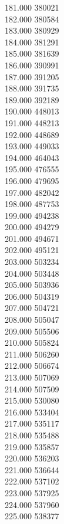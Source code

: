 { 181.000	380021 \\
 182.000	380584 \\
 183.000	380929 \\
 184.000	381291 \\
 185.000	381639 \\
 186.000	390991 \\
 187.000	391205 \\
 188.000	391735 \\
 189.000	392189 \\
 190.000	448013 \\
 191.000	448213 \\
 192.000	448689 \\
 193.000	449033 \\
 194.000	464043 \\
 195.000	476555 \\
 196.000	479695 \\
 197.000	482042 \\
 198.000	487753 \\
 199.000	494238 \\
 200.000	494279 \\
 201.000	494671 \\
 202.000	495121 \\
 203.000	503234 \\
 204.000	503448 \\
 205.000	503936 \\
 206.000	504319 \\
 207.000	504721 \\
 208.000	505047 \\
 209.000	505506 \\
 210.000	505824 \\
 211.000	506260 \\
 212.000	506674 \\
 213.000	507069 \\
 214.000	507509 \\
 215.000	530080 \\
 216.000	533404 \\
 217.000	535117 \\
 218.000	535488 \\
 219.000	535857 \\
 220.000	536203 \\
 221.000	536644 \\
 222.000	537102 \\
 223.000	537925 \\
 224.000	537960 \\
 225.000	538377 \\
}
